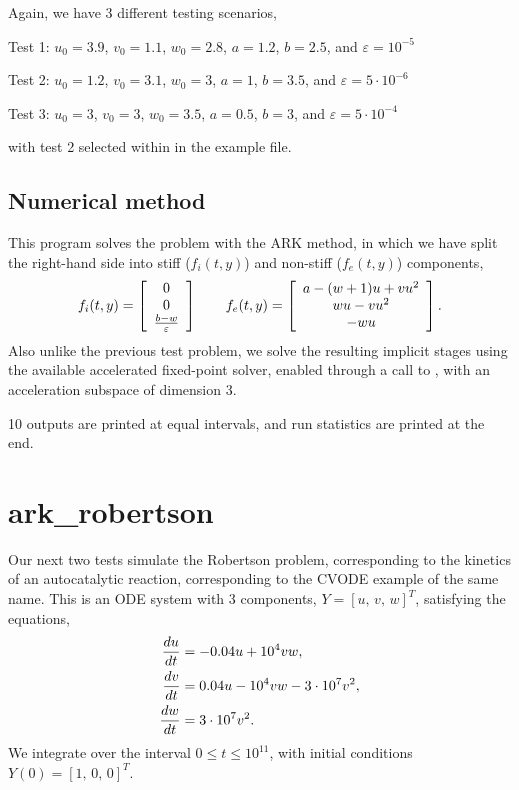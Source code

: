 \documentclass[letterpaper,10pt,english]{sphinxmanual}
\begin{document}
Again, we have 3 different testing scenarios,

Test 1:  \(u_0=3.9\),  \(v_0=1.1\),  \(w_0=2.8\),
\(a=1.2\), \(b=2.5\), and \(\varepsilon=10^{-5}\)

Test 2:  \(u_0=1.2\), \(v_0=3.1\), \(w_0=3\), \(a=1\),
\(b=3.5\), and \(\varepsilon=5\cdot10^{-6}\)

Test 3:  \(u_0=3\), \(v_0=3\), \(w_0=3.5\), \(a=0.5\),
\(b=3\), and \(\varepsilon=5\cdot10^{-4}\)

with test 2 selected within in the example file.


\subsection{Numerical method}
\label{c_serial:id9}
This program solves the problem with the ARK method, in which we have
split the right-hand side into stiff (\(f_i(t,y)\)) and non-stiff
(\(f_e(t,y)\)) components,
\begin{gather}
\begin{split}f_i(t,y) = \left[\begin{array}{c}
   0 \\ 0 \\ \frac{b-w}{\varepsilon}
\end{array}\right]
\qquad
f_e(t,y) = \left[\begin{array}{c}
   a - (w+1)u + v u^2 \\ w u - v u^2 \\ - w u
\end{array}\right].\end{split}\notag
\end{gather}
Also unlike the previous test problem, we solve the resulting implicit
stages using the available accelerated fixed-point solver, enabled
through a call to , with an acceleration
subspace of dimension 3.

10 outputs are printed at equal intervals, and run statistics
are printed at the end.


\section{ark\_robertson}
\label{c_serial:id10}\label{c_serial:ark-robertson}
Our next two tests simulate the Robertson problem, corresponding to the
kinetics of an autocatalytic reaction, corresponding to the CVODE
example of the same name.  This is an ODE system with 3
components, \(Y = [u,\, v,\, w]^T\), satisfying the equations,
\begin{gather}
\begin{split}\frac{du}{dt} &= -0.04 u + 10^4 v w, \\
\frac{dv}{dt} &= 0.04 u - 10^4 v w - 3\cdot10^7 v^2, \\
\frac{dw}{dt} &= 3\cdot10^7 v^2.\end{split}\notag
\end{gather}
We integrate over the interval \(0\le t\le 10^{11}\), with initial
conditions  \(Y(0) = [1,\, 0,\, 0]^T\).
\end{document}
